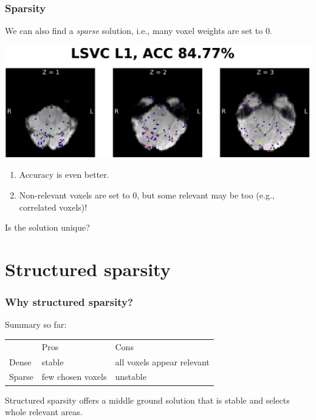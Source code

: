 \documentclass[11pt]{beamer}
\begin{document}
\begin{frame}
    \frametitle{Sparsity}

    We can also find a \emph{sparse} solution, i.e., many voxel weights are set
    to 0.
    
    \vspace*{-0.9cm}

    \begin{center}
        \includegraphics[scale=0.7]{figures/lsvc_l1-axial.png}
    \end{center}

    \vspace*{-0.2cm}

    \begin{enumerate}
        \item Accuracy is even better.
        \item Non-relevant voxels are set to 0, but some relevant may be too
            (e.g., correlated voxels)!
    \end{enumerate}

    Is the solution unique?

\end{frame}

\section{Structured sparsity}
\label{sec:Structured sparsity}

\begin{frame}
    \frametitle{Why structured sparsity?}

    Summary so far:

    \begin{center}
        \begin{tabular}[h]{@{}lll@{}}
            & Pros & Cons \\
            \cmidrule(r){2-3}
            Dense & stable & all voxels appear relevant \\
            Sparse & few chosen voxels & unstable
        \end{tabular}
    \end{center} 
    
    \pause

    Structured sparsity offers a middle ground solution that is stable and
    selects whole relevant areas.

\end{frame}
\end{document}
